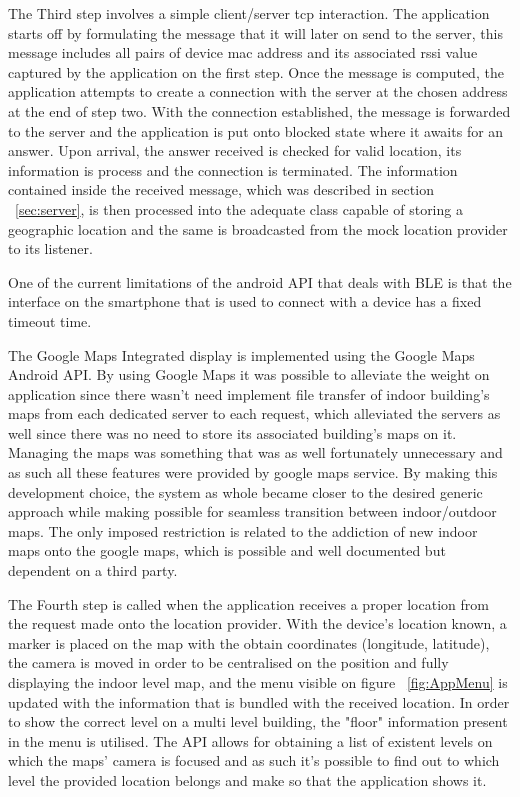 The Third step involves a simple client/server tcp interaction. The application starts off by formulating the message that it will later on send to the server, this message includes all pairs of device mac address and its associated rssi value captured by the application on the first step. Once the message is computed, the application attempts to create a connection with the server at the chosen address at the end of step two. With the connection established, the message is forwarded to the server and the application is put onto blocked state where it awaits for an answer. Upon arrival, the answer received is checked for valid location, its information is process and the connection is terminated. The information contained inside the received message, which was described in section ~\ref{sec:server}, is then processed into the adequate class capable of storing a geographic location and the same is broadcasted from the mock location provider to its listener. 



One of the current limitations of the android API that deals with \ac{BLE} is that the interface on the smartphone that is used to connect with a device has a fixed timeout time.  %


The Google Maps Integrated display is implemented using the Google Maps Android API. By using Google Maps it was possible to alleviate the weight on application since there wasn't need implement file transfer of indoor building's maps from each dedicated server to each request, which alleviated the servers as well since there was no need to store its associated building's maps on it. Managing the maps was something that was as well fortunately unnecessary and as such all these features were provided by google maps service. By making this development choice, the system as whole became closer to the desired generic approach while making possible for seamless transition between indoor/outdoor maps. The only imposed restriction is related to the addiction of new indoor maps onto the google maps, which is possible and well documented but dependent on a third party.

The Fourth step is called when the application receives a proper location from the request made onto the location provider. With the device's location known, a marker is placed on the map with the obtain coordinates (longitude, latitude), the camera is moved in order to be centralised on the position and fully displaying the indoor level map, and the menu visible on figure ~\ref{fig:AppMenu} is updated with the information that is bundled with the received location. In order to show the correct level on a multi level building, the "floor" information present in the menu is utilised. The API allows for obtaining a list of existent levels on which the maps' camera is focused and as such it's possible to find out to which level the provided location belongs and make so that the application shows it.

